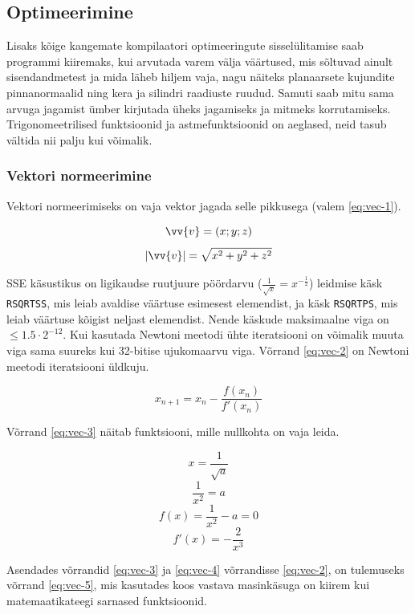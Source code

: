 \documentclass[a4paper,12pt]{report}
\renewcommand{\vec}[1]{\vv{#1}}
\begin{document}
\subsection{Optimeerimine}
Lisaks kõige kangemate kompilaatori optimeeringute sisselülitamise saab
programmi kiiremaks, kui arvutada varem välja väärtused, mis sõltuvad
ainult sisendandmetest ja mida läheb hiljem vaja, nagu näiteks planaarsete
kujundite pinnanormaalid ning kera ja silindri raadiuste ruudud. Samuti
saab mitu sama arvuga jagamist ümber kirjutada üheks jagamiseks ja mitmeks
korrutamiseks. Trigonomeetrilised funktsioonid ja astmefunktsioonid on
aeglased, neid tasub vältida nii palju kui võimalik.

\subsubsection{Vektori normeerimine}
Vektori normeerimiseks on vaja vektor jagada selle pikkusega (valem \ref{eq:vec-1}).

\[\vec v = (x; y; z)\]
\begin{equation} \label{eq:vec-1}
|\vec v| = \sqrt{x^2 + y^2 + z^2}
\end{equation}

SSE käsustikus on ligikaudse ruutjuure pöördarvu (\(\frac 1 {\sqrt x} = x^{-\frac12}\)) leidmise käsk
\texttt{RSQRTSS}, mis leiab avaldise väärtuse esimesest elemendist, ja
käsk \texttt{RSQRTPS}, mis leiab väärtuse kõigist neljast elemendist.
Nende käskude maksimaalne viga on \(\leq 1.5 \cdot 2^{-12}\). Kui kasutada Newtoni
meetodi ühte iteratsiooni on võimalik muuta viga sama suureks kui 32-bitise
ujukomaarvu viga. Võrrand \ref{eq:vec-2} on Newtoni meetodi iteratsiooni
üldkuju.

\begin{equation} \label{eq:vec-2}
x_{n+1} = x_n - \frac {f(x_n)}{f'(x_n)}
\end{equation}

Võrrand \ref{eq:vec-3} näitab funktsiooni, mille nullkohta on vaja leida.

\[x = \frac 1 {\sqrt a}\]
\[\frac 1{x^2} = a\]
\begin{equation} \label{eq:vec-3}
f(x) = \frac 1{x^2} - a = 0
\end{equation}
\begin{equation} \label{eq:vec-4}
f'(x) = -\frac 2{x^3}
\end{equation}

Asendades võrrandid \ref{eq:vec-3} ja \ref{eq:vec-4} võrrandisse \ref{eq:vec-2},
on tulemuseks võrrand \ref{eq:vec-5}, mis kasutades koos vastava masinkäsuga
on kiirem kui matemaatikateegi sarnased funktsioonid.
\end{document}

